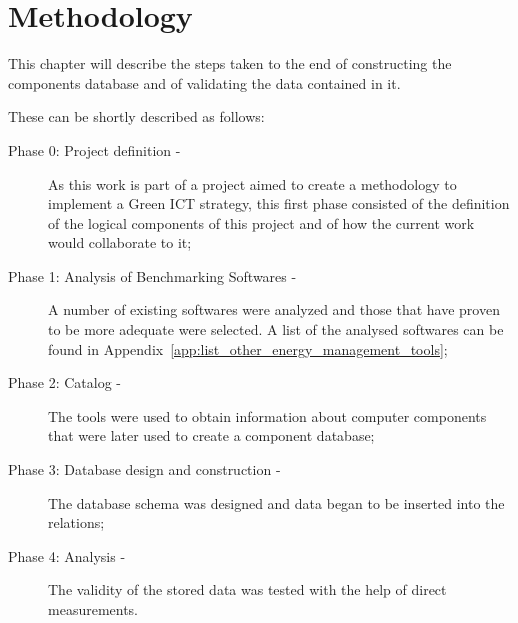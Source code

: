 

\chapter{Methodology} \label{chap3:methodology}

   This chapter will describe the steps taken to the end of constructing the components database and of validating the data contained in it.
   
These can be shortly described as follows:
    \begin{description}
        \item[Phase 0: Project definition -] As this work is part of a project aimed to create a methodology to implement a Green ICT strategy, this first phase consisted of the definition of the logical components of this project and of how the current work would collaborate to it;%
        \item[Phase 1: Analysis of Benchmarking Softwares -] A number of existing softwares were analyzed and those that have proven to be more adequate were selected. A list of the analysed softwares can be found in Appendix~\ref{app:list_other_energy_management_tools};
        \item[Phase 2: Catalog -] The tools were used to obtain information about computer components that were later used to create a component database;
        \item[Phase 3: Database design and construction -] The database schema was designed and data began to be inserted into the relations;
        \item[Phase 4: Analysis -] The validity of the stored data was tested with the help of direct measurements.
    \end{description}


